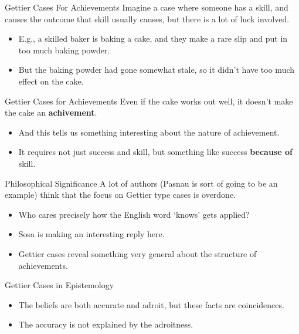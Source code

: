 \documentclass[
  17pt,
  letterpaper,
  ignorenonframetext,
  aspectratio=169,
]{beamer}
\providecommand{\tightlist}{%
  \setlength{\itemsep}{0pt}\setlength{\parskip}{0pt}}\usepackage{longtable,booktabs,array}
\begin{document}
\begin{frame}{Gettier Cases For Achievements}
\protect\hypertarget{gettier-cases-for-achievements}{}
Imagine a case where someone has a skill, and causes the outcome that
skill usually causes, but there is a lot of luck involved.

\begin{itemize}[<+->]
\tightlist
\item
  E.g., a skilled baker is baking a cake, and they make a rare slip and
  put in too much baking powder.
\item
  But the baking powder had gone somewhat stale, so it didn't have too
  much effect on the cake.
\end{itemize}
\end{frame}

\begin{frame}{Gettier Cases for Achievements}
\protect\hypertarget{gettier-cases-for-achievements-1}{}
Even if the cake works out well, it doesn't make the cake an
\textbf{achivement}.

\begin{itemize}[<+->]
\tightlist
\item
  And this tells us something interesting about the nature of
  achievement.
\item
  It requires not just success and skill, but something like success
  \textbf{because of} skill.
\end{itemize}
\end{frame}

\begin{frame}{Philosophical Significance}
\protect\hypertarget{philosophical-significance}{}
A lot of authors (Pasnau is sort of going to be an example) think that
the focus on Gettier type cases is overdone.

\begin{itemize}[<+->]
\tightlist
\item
  Who cares precisely how the English word `knows' gets applied?
\item
  Sosa is making an interesting reply here.
\item
  Gettier cases reveal something very general about the structure of
  achievements.
\end{itemize}
\end{frame}

\begin{frame}{Gettier Cases in Epistemology}
\protect\hypertarget{gettier-cases-in-epistemology}{}
\begin{itemize}[<+->]
\tightlist
\item
  The beliefs are both accurate and adroit, but these facts are
  coincidences.
\item
  The accuracy is not explained by the adroitness.
\end{itemize}
\end{frame}
\end{document}
